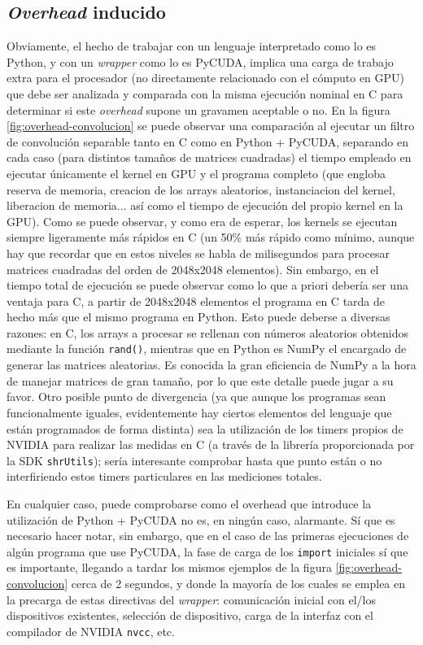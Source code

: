 \documentclass[twocolumn,twoside]{Jornadas}
\begin{document}
\subsection{\emph{Overhead} inducido}

Obviamente, el hecho de trabajar con un lenguaje interpretado como lo es Python, y con un \emph{wrapper} como lo es PyCUDA, implica una carga de trabajo extra para el procesador (no directamente relacionado con el cómputo en GPU) que debe ser analizada y comparada con la misma ejecución nominal en C para determinar si este \emph{overhead} supone un gravamen aceptable o no. En la figura \ref{fig:overhead-convolucion} se puede observar una comparación al ejecutar un filtro de convolución separable \cite{imagecuda} tanto en C como en Python + PyCUDA, separando en cada caso (para distintos tamaños de matrices cuadradas) el tiempo empleado en ejecutar únicamente el kernel en GPU y el programa completo (que engloba reserva de memoria, creacion de los arrays aleatorios, instanciacion del kernel, liberacion de memoria... así como el tiempo de ejecución del propio kernel en la GPU). Como se puede observar, y como era de esperar, los kernels se ejecutan siempre ligeramente más rápidos en C (un 50\% más rápido como mínimo, aunque hay que recordar que en estos niveles se habla de milisegundos para procesar matrices cuadradas del orden de 2048x2048 elementos). Sin embargo, en el tiempo total de ejecución se puede observar como lo que a priori debería ser una ventaja para C, a partir de 2048x2048 elementos el programa en C tarda de hecho más que el mismo programa en Python. Esto puede deberse a diversas razones: en C, los arrays a procesar se rellenan con números aleatorios obtenidos mediante la función {\tt rand()}, mientras que en Python es NumPy el encargado de generar las matrices aleatorias. Es conocida la gran eficiencia de NumPy a la hora de manejar matrices de gran tamaño, por lo que este detalle puede jugar a su favor. Otro posible punto de divergencia (ya que aunque los programas sean funcionalmente iguales, evidentemente hay ciertos elementos del lenguaje que están programados de forma distinta) sea la utilización de los timers propios de NVIDIA para realizar las medidas en C (a través de la librería proporcionada por la SDK {\tt shrUtils}); sería interesante comprobar hasta que punto están o no interfiriendo estos timers particulares en las mediciones totales.

\vspace{5 mm}

En cualquier caso, puede comprobarse como el overhead que introduce la utilización de Python + PyCUDA no es, en ningún caso, alarmante. Sí que es necesario hacer notar, sin embargo, que en el caso de las primeras ejecuciones de algún programa que use PyCUDA, la fase de carga de los {\tt import} iniciales sí que es importante, llegando a tardar los mismos ejemplos de la figura \ref{fig:overhead-convolucion} cerca de 2 segundos, y donde la mayoría de los cuales se emplea en la precarga de estas directivas del \emph{wrapper}: comunicación inicial con el/los dispositivos existentes, selección de dispositivo, carga de la interfaz con el compilador de NVIDIA {\tt nvcc}, etc.
\end{document}
